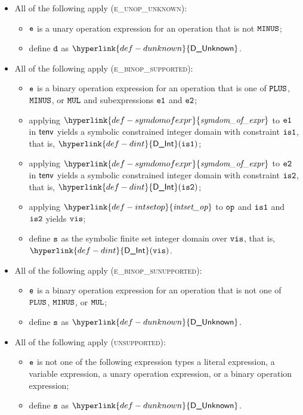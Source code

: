 \documentclass{book}
\newcommand\DInt[0]{\hyperlink{def-dint}{\textsf{D\_Int}}}
\newcommand\DUnknown[0]{\hyperlink{def-dunknown}{\textsf{D\_Unknown}}}
\newcommand\symdomofexpr[0]{\hyperlink{def-symdomofexpr}{\textfunc{symdom\_of\_expr}}}
\newcommand\intsetop[0]{\hyperlink{def-intsetop}{\textfunc{intset\_op}}}
\begin{document}
\begin{itemize}
  \item All of the following apply (\textsc{e\_unop\_unknown}):
  \begin{itemize}
    \item $\texttt{e}$ is a unary operation expression for an operation that is not $\texttt{MINUS}$;
    \item define $\texttt{d}$ as $\DUnknown$.
  \end{itemize}

  \item All of the following apply (\textsc{e\_binop\_supported}):
  \begin{itemize}
    \item $\texttt{e}$ is a binary operation expression for an operation that is one of $\texttt{PLUS}$, $\texttt{MINUS}$, or $\texttt{MUL}$
          and subexpressions $\texttt{e1}$ and $\texttt{e2}$;
    \item applying $\symdomofexpr$ to $\texttt{e1}$ in $\textsf{tenv}$ yields a symbolic constrained integer domain with constraint $\texttt{is1}$,
          that is, $\DInt(\visone)$;
    \item applying $\symdomofexpr$ to $\texttt{e2}$ in $\textsf{tenv}$ yields a symbolic constrained integer domain with constraint $\texttt{is2}$,
          that is, $\DInt(\vistwo)$;
    \item applying $\intsetop$ to $\texttt{op}$ and $\texttt{is1}$ and $\texttt{is2}$ yields $\texttt{vis}$;
    \item define $\texttt{s}$ as the symbolic finite set integer domain over $\texttt{vis}$, that is, $\DInt(\vis)$.
  \end{itemize}

  \item All of the following apply (\textsc{e\_binop\_sunupported}):
  \begin{itemize}
    \item $\texttt{e}$ is a binary operation expression for an operation that is not one of $\texttt{PLUS}$, $\texttt{MINUS}$, or $\texttt{MUL}$;
    \item define $\texttt{s}$ as $\DUnknown$.
  \end{itemize}

  \item All of the following apply (\textsc{unsupported}):
  \begin{itemize}
    \item $\texttt{e}$ is not one of the following expression types a literal expression, a variable expression, a unary operation
          expression, or a binary operation expression;
    \item define $\texttt{s}$ as $\DUnknown$.
  \end{itemize}
\end{itemize}
\end{document}
